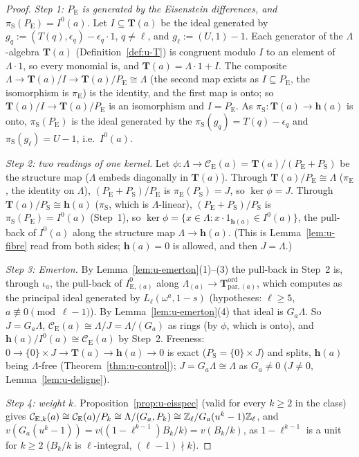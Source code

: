 \documentclass[11pt]{article}
\newcommand{\Iw}{\Lambda}                         %
\newcommand{\hcusp}{\mathbf{h}}                   %
\newcommand{\Tu}{\mathbf{T}}                      %
\newcommand{\Pk}[1]{P_{#1}}                       %
\newcommand{\Eis}{\mathrm{E}}
\newcommand{\cusp}{\mathrm{S}}
\newcommand{\Cg}{\mathcal{C}}                     %
\newcommand{\ee}{\epsilon}                        %
\newcommand{\Zl}{\Z_\ell}
\begin{document}
\begin{proof}
\emph{Step 1: $P_\Eis$ is generated by the Eisenstein differences, and $\pi_\cusp(P_\Eis)=I^{0}(a)$.} Let $I\subseteq\Tu(a)$ be the ideal generated by
$g_q:=(T(q),\ee_q)-\ee_q\cdot1$, $q\ne\ell$, and $g_\ell:=(U,1)-1$. Each generator of the $\Iw$-algebra $\Tu(a)$ (Definition~\ref{def:u-T}) is congruent modulo $I$ to an
element of $\Iw\cdot1$, so every monomial is, and $\Tu(a)=\Iw\cdot1+I$. The composite $\Iw\to\Tu(a)/I\to\Tu(a)/P_\Eis\cong\Iw$ (the second map exists as
$I\subseteq P_\Eis$, the isomorphism is $\pi_\Eis$) is the identity, and the first map is onto; so $\Tu(a)/I\to\Tu(a)/P_\Eis$ is an isomorphism and $I=P_\Eis$. As
$\pi_\cusp\colon\Tu(a)\to\hcusp(a)$ is onto, $\pi_\cusp(P_\Eis)$ is the ideal generated by the $\pi_\cusp(g_q)=T(q)-\ee_q$ and $\pi_\cusp(g_\ell)=U-1$, i.e.\ $I^{0}(a)$.

\emph{Step 2: two readings of one kernel.} Let $\phi\colon\Iw\to\Cg_\Eis(a)=\Tu(a)/(P_\Eis+P_\cusp)$ be the structure map ($\Iw$ embeds diagonally in $\Tu(a)$). Through
$\Tu(a)/P_\Eis\cong\Iw$ ($\pi_\Eis$, the identity on $\Iw$), $(P_\Eis+P_\cusp)/P_\Eis$ is $\pi_\Eis(P_\cusp)=J$, so $\ker\phi=J$. Through $\Tu(a)/P_\cusp\cong\hcusp(a)$
($\pi_\cusp$, which is $\Iw$-linear), $(P_\Eis+P_\cusp)/P_\cusp$ is $\pi_\cusp(P_\Eis)=I^{0}(a)$ (Step~1), so $\ker\phi=\{x\in\Iw:x\cdot1_{\hcusp(a)}\in I^{0}(a)\}$, the
pull-back of $I^{0}(a)$ along the structure map $\Iw\to\hcusp(a)$. (This is Lemma~\ref{lem:u-fibre} read from both sides; $\hcusp(a)=0$ is allowed, and then
$J=\Iw$.)

\emph{Step 3: Emerton.} By Lemma~\ref{lem:u-emerton}(1)--(3) the pull-back in Step~2 is, through $\iota_a$, the pull-back of $I^{0}_{\Eis,(a)}$ along
$\Iw_{(a)}\to\mathbf T^{\mathrm{ord}}_{\mathrm{par},(a)}$, which \cite[Thm.~5]{emerton_eis} computes as the principal ideal generated by $L_\ell(\omega^{a},1-s)$ (hypotheses: $\ell\ge5$,
$a\not\equiv0\pmod{\ell-1}$). By Lemma~\ref{lem:u-emerton}(4) that ideal is $G_a\Iw$. So $J=G_a\Iw$, $\Cg_\Eis(a)\cong\Iw/J=\Iw/(G_a)$ as rings (by $\phi$, which is onto), and
$\hcusp(a)/I^{0}(a)\cong\Cg_\Eis(a)$ by Step~2. Freeness: $0\to\{0\}\times J\to\Tu(a)\to\hcusp(a)\to0$ is exact ($P_\cusp=\{0\}\times J$) and splits, $\hcusp(a)$ being
$\Iw$-free (Theorem~\ref{thm:u-control}); $J=G_a\Iw\cong\Iw$ as $G_a\ne0$ ($J\ne0$, Lemma~\ref{lem:u-deligne}).

\emph{Step 4: weight $k$.} Proposition~\ref{prop:u-eisspec} (valid for every $k\ge2$ in the class) gives $\Cg_{\Eis,k}(a)\cong\Cg_\Eis(a)/\Pk{k}\cong\Iw/(G_a,\Pk{k})\cong
\Zl/G_a(u^{k}-1)\Zl$, and $v(G_a(u^{k}-1))=v\bigl((1-\ell^{k-1})B_k/k\bigr)=v(B_k/k)$, as $1-\ell^{k-1}$ is a unit for $k\ge2$ ($B_k/k$ is $\ell$-integral, $(\ell-1)\nmid k$).
\end{proof}
\end{document}
